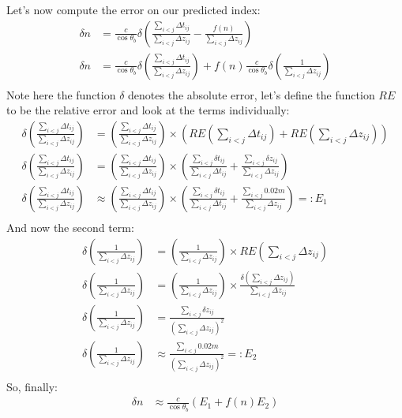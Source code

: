 Let's now compute the error on our predicted index:
\begin{align}
  \delta n &= \frac{c}{\cos{\theta_b}}\delta\left(\frac{\sum_{i<j}\Delta t_{ij}}{\sum_{i<j} \Delta z_{ij}} - \frac{f(n)}{\sum_{i<j} \Delta z_{ij}}\right)\\
  \delta n &= \frac{c}{\cos{\theta_b}}\delta\left(\frac{\sum_{i<j}\Delta t_{ij}}{\sum_{i<j} \Delta z_{ij}}\right)+ f(n)\frac{c}{\cos{\theta_b}}\delta\left(\frac{1}{\sum_{i<j} \Delta z_{ij}}\right)\\
\end{align}
Note here the function $\delta$ denotes the absolute error, let's define the function $RE$ to be the relative error and look at the terms individually:
\begin{align}
  \delta\left(\frac{\sum_{i<j}\Delta t_{ij}}{\sum_{i<j} \Delta z_{ij}}\right) &= \left(\frac{\sum_{i<j}\Delta t_{ij}}{\sum_{i<j} \Delta z_{ij}}\right)\times\left(RE\left(\sum_{i<j}\Delta t_{ij}\right) + RE\left(\sum_{i<j} \Delta z_{ij}\right)\right)\\
\delta\left(\frac{\sum_{i<j}\Delta t_{ij}}{\sum_{i<j} \Delta z_{ij}}\right) &= \left(\frac{\sum_{i<j}\Delta t_{ij}}{\sum_{i<j} \Delta z_{ij}}\right)\times\left(\frac{\sum_{i<j}\delta t_{ij}}{\sum_{i<j}\Delta t_{ij}} + \frac{\sum_{i<j}\delta z_{ij}}{\sum_{i<j}\Delta z_{ij}}\right)\\
\delta\left(\frac{\sum_{i<j}\Delta t_{ij}}{\sum_{i<j} \Delta z_{ij}}\right) &\approx \left(\frac{\sum_{i<j}\Delta t_{ij}}{\sum_{i<j} \Delta z_{ij}}\right)\times\left(\frac{\sum_{i<j}\delta t_{ij}}{\sum_{i<j}\Delta t_{ij}} + \frac{\sum_{i<j}0.02m}{\sum_{i<j}\Delta z_{ij}}\right) =: E_1\\
\end{align}
And now the second term:
\begin{align}
  \delta\left(\frac{1}{\sum_{i<j} \Delta z_{ij}}\right) &= \left(\frac{1}{\sum_{i<j} \Delta z_{ij}}\right)\times RE\left(\sum_{i<j}\Delta z_{ij}\right) \\
  \delta\left(\frac{1}{\sum_{i<j} \Delta z_{ij}}\right) &= \left(\frac{1}{\sum_{i<j} \Delta z_{ij}}\right)\times \frac{\delta\left(\sum_{i<j}\Delta z_{ij}\right)}{\sum_{i<j}\Delta z_{ij}} \\
  \delta\left(\frac{1}{\sum_{i<j} \Delta z_{ij}}\right) &= \frac{\sum_{i<j}\delta z_{ij}}{\left(\sum_{i<j}\Delta z_{ij}\right)^2} \\
  \delta\left(\frac{1}{\sum_{i<j} \Delta z_{ij}}\right) &\approx \frac{\sum_{i<j}0.02m}{\left(\sum_{i<j}\Delta z_{ij}\right)^2} =: E_2\\
\end{align}
So, finally:
\begin{align}
  \delta n &\approx \frac{c}{\cos\theta_b}\left(E_1 + f(n)E_2\right)
\end{align}
